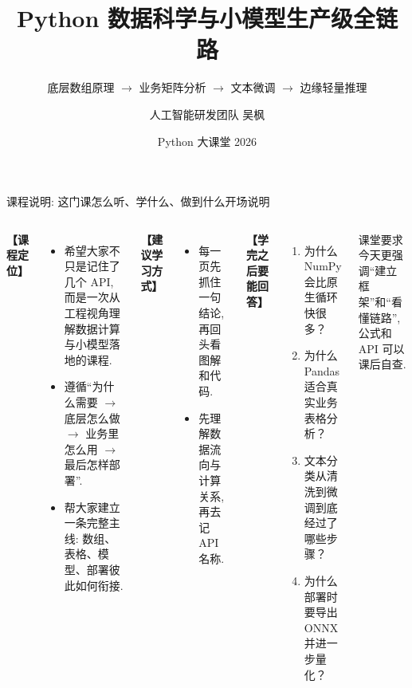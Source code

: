 \documentclass[aspectratio=169,9pt]{beamer}
\title[数据分析与小模型]{Python 数据科学与小模型生产级全链路}
\subtitle{底层数组原理 $\to$ 业务矩阵分析 $\to$ 文本微调 $\to$ 边缘轻量推理}
\author{人工智能研发团队  吴枫}
\date{Python 大课堂 2026}
\begin{document}
\begin{frame}
    \titlepage
\end{frame}

\begin{frame}{课程说明: 这门课怎么听、学什么、做到什么}{开场说明}
\begin{columns}[T]
    \textbf{【课程定位】}
    \begin{itemize}
        \item 希望大家不只是记住了几个 API, 而是一次从工程视角理解数据计算与小模型落地的课程.
        \item 遵循“为什么需要 $\to$ 底层怎么做 $\to$ 业务里怎么用 $\to$ 最后怎样部署”.
        \item 帮大家建立一条完整主线: 数组、表格、模型、部署彼此如何衔接.
    \end{itemize}

    \textbf{【建议学习方式】}
    \begin{itemize}
        \item 每一页先抓住一句结论, 再回头看图解和代码.
        \item 先理解数据流向与计算关系, 再去记 API 名称.
    \end{itemize}

    \textbf{【学完之后要能回答】}
    \begin{enumerate}
        \item 为什么 NumPy 会比原生循环快很多？
        \item 为什么 Pandas 适合真实业务表格分析？
        \item 文本分类从清洗到微调到底经过了哪些步骤？
        \item 为什么部署时要导出 ONNX 并进一步量化？
    \end{enumerate}

    \begin{alertblock}{课堂要求}
        \scriptsize 今天更强调“建立框架”和“看懂链路”, 公式和 API 可以课后自查.
    \end{alertblock}
\end{columns}
\end{frame}
\end{document}
